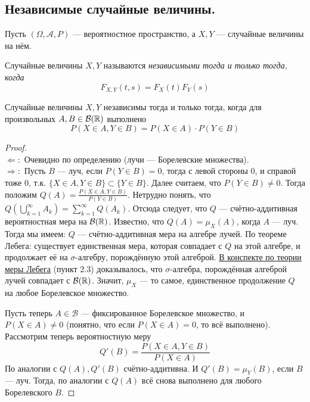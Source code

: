 \subsection{Независимые случайные величины.}
Пусть $(\Omega, \mathcal{A}, P)$ --- вероятностное пространство, а $X, Y$ --- случайные
величины на нём.
\begin{definition}
    Случайные величины $X, Y$ называются \it{независимыми} тогда и только тогда, когда
    \[
        F_{X, Y}(t, s) = F_X(t)F_Y(s)
    \]
\end{definition}
\begin{proposal}
    Случайные величины $X, Y$ независимы тогда и только тогда, когда для произвольных $A, B \in \mathcal{B}(\mathbb{R})$
    выполнено
    \[
        P(X \in A, Y \in B) = P(X \in A) \cdot P(Y \in B)
    \]
\end{proposal}
\begin{proof}
    ~\\
    $\Leftarrow \colon$ Очевидно по определению (лучи --- Борелевские множества).\\
    $\Rightarrow \colon$ Пусть $B$ --- луч, если $P(Y \in B) = 0$, тогда с левой стороны $0$, и справой тоже $0$,
    т.к. $\{X \in A, Y \in B\} \subset \{Y \in B\}$. Далее считаем, что $P(Y \in B) \neq 0$. Тогда положим
    $Q(A) = \frac{P(X \in A, Y \in B)}{P(Y \in B)}$. Нетрудно понять, что
    $Q\left( \bigcup_{k = 1}^{\infty} A_k \right) = \sum\limits_{k = 1}^{\infty} Q(A_k)$. Отсюда следует, что
    $Q$ --- счётно-аддитивная вероятностная мера на $\mathcal{B}(\mathbb{R})$. Известно, что $Q(A) = \mu_X(A)$, когда
    $A$ --- луч. Тогда мы имеем: $Q$ --- счётно-аддитивная мера на алгебре лучей. По теореме Лебега:
    существует единственная мера, которая совпадает с $Q$ на этой алгебре, и продолжает её на $\sigma$-алгебру,
    порождённую этой алгеброй. \href{https://raw.githubusercontent.com/johanDDC/My_TeXs/5981fbe92fbd8dfae37ea2c29fbf204a942d0d09/pdf/Lebeg/Lebeg.pdf}{В конспекте по теории меры Лебега} (пункт 2.3)
    доказывалось, что $\sigma$-алгебра, порождённая алгеброй лучей совпадает с $\mathcal{B}(\mathbb{R})$. Значит,
    $\mu_X$ --- то самое, единственное продолжение $Q$ на любое Борелевское множество.

    Пусть теперь $A \in \mathcal{B}$ --- фиксированное Борелевское множество, и $P(X \in A) \neq 0$ (понятно, что
    если $P(X \in A) = 0$, то всё выполнено). Рассмотрим теперь вероятностную меру
    \[
        Q'(B) = \frac{P(X \in A, Y \in B)}{P(X \in A)}
    \]
    По аналогии с $Q(A), Q'(B)$ счётно-аддитивна. И $Q'(B) = \mu_Y(B)$, если $B$ --- луч. Тогда, по аналогии с
    $Q(A)$ всё снова выполнено для любого Борелевского $B$.
\end{proof}

